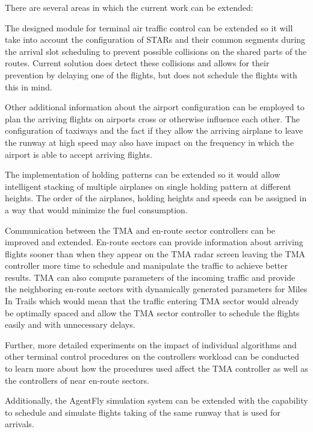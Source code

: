 There are several areas in which the current work can be extended:
\bitem
\item The designed module for terminal air traffic control can be extended so it will take into account the configuration of STARs and their common segments during the arrival slot scheduling to prevent possible collisions on the shared parts of the routes. Current solution does detect these collisions and allows for their prevention by delaying one of the flights, but does not schedule the flights with this in mind. 
\item Other additional information about the airport configuration can be employed to plan the arriving flights on airports cross or otherwise influence each other. The configuration of taxiways and the fact if they allow the arriving airplane to leave the runway at high speed may also have impact on the frequency in which the airport is able to accept arriving flights.
\item The implementation of holding patterns can be extended so it would allow intelligent stacking of multiple airplanes on single holding pattern at different heights. The order of the airplanes, holding heights and speeds can be assigned in a way that would minimize the fuel consumption.
\item Communication between the TMA and en-route sector controllers can be improved and extended. En-route sectors can provide information about arriving flights sooner than when they appear on the TMA radar screen leaving the TMA controller more time to schedule and manipulate the traffic to achieve better results. TMA can also compute parameters of the incoming traffic and provide the neighboring en-route sectors with dynamically generated parameters for Miles In Trails which would mean that the traffic entering TMA sector would already be optimally spaced and allow the TMA sector controller to schedule the flights easily and with unnecessary delays.
\item Further, more detailed experiments on the impact of individual algorithms and other terminal control procedures on the controllers workload can be conducted to learn more about how the procedures used affect the TMA controller as well as the controllers of near en-route sectors.
\item Additionally, the AgentFly simulation system can be extended with the capability to schedule and simulate flights taking of the same runway that is used for arrivals.
\eitem